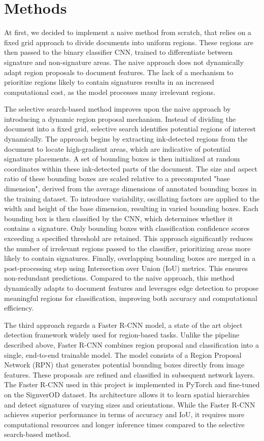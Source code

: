 \documentclass[a4paper,12pt]{article}
\begin{document}
\section{Methods}
At first, we decided to implement a naive method from scratch, that relies on a fixed grid approach to divide documents into uniform regions. These regions are then passed to the binary classifier CNN, trained to differentiate between signature and non-signature areas. The naive approach does not dynamically adapt region proposals to document features. The lack of a mechanism to prioritize regions likely to contain signatures results in an increased computational cost, as the model processes many irrelevant regions.

The selective search-based method improves upon the naive approach by introducing a dynamic region proposal mechanism. Instead of dividing the document into a fixed grid, selective search identifies potential regions of interest dynamically. The approach begins by extracting ink-detected regions from the document to locate high-gradient areas, which are indicative of potential signature placements. A set of bounding boxes is then initialized at random coordinates within these ink-detected parts of the document. The size and aspect ratio of these bounding boxes are scaled relative to a precomputed "base dimension", derived from the average dimensions of annotated bounding boxes in the training dataset. To introduce variability, oscillating factors are applied to the width and height of the base dimension, resulting in varied bounding boxes. Each bounding box is then classified by the CNN, which determines whether it contains a signature. Only bounding boxes with classification confidence scores exceeding a specified threshold are retained. This approach significantly reduces the number of irrelevant regions passed to the classifier, prioritizing areas more likely to contain signatures. Finally, overlapping bounding boxes are merged in a post-processing step using Intersection over Union (IoU) metrics. This ensures non-redundant predictions. Compared to the naive approach, this method dynamically adapts to document features and leverages edge detection to propose meaningful regions for classification, improving both accuracy and computational efficiency.

The third approach regards a Faster R-CNN model, a state of the art object detection framework widely used for region-based tasks. Unlike the pipeline described above, Faster R-CNN combines region proposal and classification into a single, end-to-end trainable model. The model consists of a Region Proposal Network (RPN) that generates potential bounding boxes directly from image features. These proposals are refined and classified in subsequent network layers. The Faster R-CNN used in this project is implemented in PyTorch and fine-tuned on the SignverOD dataset. Its architecture allows it to learn spatial hierarchies and detect signatures of varying sizes and orientations. While the Faster R-CNN achieves superior performance in terms of accuracy and IoU, it requires more computational resources and longer inference times compared to the selective search-based method.
\end{document}
